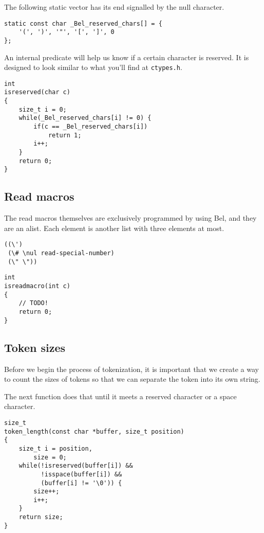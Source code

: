 \documentclass[openright,a4paper,twoside,12pt]{memoir}
\begin{document}
The following static vector has its end signalled by the null character.

\begin{verbatim}
static const char _Bel_reserved_chars[] = {
    '(', ')', '"', '[', ']', 0
};
\end{verbatim}

An internal  predicate will  help us  know if  a certain  character is
reserved.  It is  designed  to look  similar to  what  you'll find  at
\texttt{ctypes.h}.

\begin{verbatim}
int
isreserved(char c)
{
    size_t i = 0;
    while(_Bel_reserved_chars[i] != 0) {
        if(c == _Bel_reserved_chars[i])
            return 1;
        i++;
    }
    return 0;
}
\end{verbatim}

\subsection{Read macros}
\label{sec:orgaf7c0b7}

The read  macros themselves are  exclusively programmed by  using Bel,
and  they are  an  alist.  Each element  is  another  list with  three
elements at most.

\begin{verbatim}
((\')
 (\# \nul read-special-number)
 (\" \"))
\end{verbatim}

\begin{verbatim}
int
isreadmacro(int c)
{
    // TODO!
    return 0;
}
\end{verbatim}

\subsection{Token sizes}
\label{sec:orgc96bcf1}

Before we begin  the process of tokenization, it is  important that we
create a way to count the sizes  of tokens so that we can separate the
token into its own string.

The next function  does that until it meets a  reserved character or a
space character.

\begin{verbatim}
size_t
token_length(const char *buffer, size_t position)
{
    size_t i = position,
        size = 0;
    while(!isreserved(buffer[i]) &&
          !isspace(buffer[i]) &&
          (buffer[i] != '\0')) {
        size++;
        i++;
    }
    return size;
}
\end{verbatim}
\end{document}
